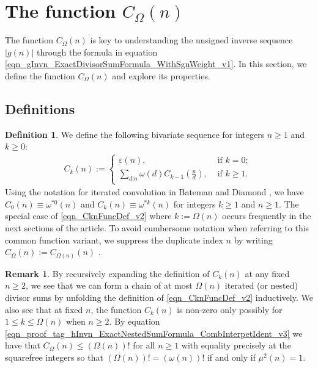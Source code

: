 \documentclass[11pt,reqno,a4letter]{article}
\numberwithin{equation}{section}
\numberwithin{figure}{section}
\numberwithin{table}{section}
\newcommand{\seqnum}[1]{\href{http://oeis.org/#1}{\color{ProcessBlue}{\underline{#1}}}}
\theoremstyle{plain}
\numberwithin{theorem}{section}
\theoremstyle{definition}
\newtheorem{remark}[theorem]{Remark}
\newtheorem{definition}[theorem]{Definition}
\begin{document}
\section{The function $C_{\Omega}(n)$} 
\label{Section_NewFormulasForgInvn_v1} 

The function $C_{\Omega}(n)$ is key to understanding the 
unsigned inverse sequence $|g(n)|$ through the formula in equation 
\eqref{eqn_gInvn_ExactDivisorSumFormula_WithSgnWeight_v1}. 
In this section, we define the function 
$C_{\Omega}(n)$ and explore its properties. 

\subsection{Definitions}

\begin{definition}
We define the following bivariate sequence for integers $n \geq 1$ and $k \geq 0$: 
\begin{align} 
\label{eqn_CknFuncDef_v2} 
C_k(n) := \begin{cases} 
     \varepsilon(n), & \text{ if $k = 0$; } \\ 
     \sum\limits_{d|n} \omega(d) C_{k-1}\left(\frac{n}{d}\right), & \text{ if $k \geq 1$. } 
     \end{cases} 
\end{align} 
Using the notation for iterated convolution in 
Bateman and Diamond \cite[Def.~ 2.3; \S 2]{ANT-BATEMAN-DIAMOND}, we have 
$C_0(n) \equiv \omega^{\ast 0}(n)$ and $C_k(n) \equiv \omega^{\ast k}(n)$ for 
integers $k \geq 1$ and $n \geq 1$. 
The special case of \eqref{eqn_CknFuncDef_v2} where 
$k := \Omega(n)$ occurs frequently in the next sections of the 
article. To avoid cumbersome notation when referring to this common function variant, we suppress the 
duplicate index $n$ by writing $C_{\Omega}(n) := C_{\Omega(n)}(n)$ \cite[\seqnum{A008480}]{OEIS}. 
\end{definition}

\begin{remark}
By recursively expanding the definition of $C_k(n)$ 
at any fixed $n \geq 2$, we see that 
we can form a chain of at most $\Omega(n)$ iterated (or nested) divisor sums by 
unfolding the definition of \eqref{eqn_CknFuncDef_v2} inductively. 
We also see that at fixed $n$, the function 
$C_k(n)$ is non-zero only possibly for 
$1 \leq k \leq \Omega(n)$ when $n \geq 2$. 
By equation \eqref{eqn_proof_tag_hInvn_ExactNestedSumFormula_CombInterpetIdent_v3} we have 
that $C_{\Omega}(n) \leq (\Omega(n))!$ for all $n \geq 1$ with 
equality precisely at the squarefree integers so that 
$(\Omega(n))! = (\omega(n))!$ if and only if $\mu^2(n) = 1$. 
\end{remark}
\end{document}
